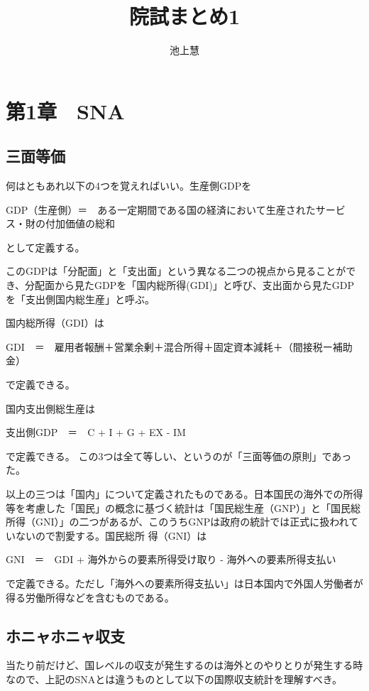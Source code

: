 \documentclass{jsarticle}
\begin{document}
\title{院試まとめ1}
\author{池上慧}
\maketitle

\section{第1章　SNA}
\subsection{三面等価}
何はともあれ以下の4つを覚えればいい。生産側GDPを
\begin{screen}
	GDP（生産側）＝　ある一定期間である国の経済において生産されたサービス・財の付加価値の総和 
\end{screen}
として定義する。

このGDPは「分配面」と「支出面」という異なる二つの視点から見ることができ、分配面から見たGDPを「国内総所得(GDI)」と呼び、支出面から見たGDPを「支出側国内総生産」と呼ぶ。

国内総所得（GDI）は
\begin{screen}
	GDI　＝　雇用者報酬＋営業余剰＋混合所得＋固定資本減耗＋（間接税ー補助金）
\end{screen}
で定義できる。

国内支出側総生産は
\begin{screen}
	支出側GDP　＝　C + I + G + EX - IM
\end{screen}
で定義できる。
この3つは全て等しい、というのが「三面等価の原則」であった。

以上の三つは「国内」について定義されたものである。日本国民の海外での所得等を考慮した「国民」の概念に基づく統計は「国民総生産（GNP）」と「国民総所得（GNI）」の二つがあるが、このうちGNPは政府の統計では正式に扱われていないので割愛する。国民総所
得（GNI）は
\begin{screen}
	GNI　＝　GDI + 海外からの要素所得受け取り - 海外への要素所得支払い
\end{screen}
で定義できる。ただし「海外への要素所得支払い」は日本国内で外国人労働者が得る労働所得などを含むものである。

\subsection{ホニャホニャ収支}
当たり前だけど、国レベルの収支が発生するのは海外とのやりとりが発生する時なので、上記のSNAとは違うものとして以下の国際収支統計を理解すべき。
\end{document}
